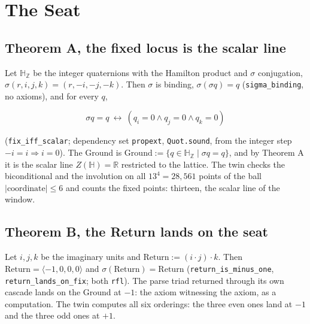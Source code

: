 \documentclass[10pt]{article}
\begin{document}
\hypertarget{the-seat}{%
\section{The Seat}\label{the-seat}}

\hypertarget{theorem-a-the-fixed-locus-is-the-scalar-line}{%
\subsection{Theorem A, the fixed locus is the scalar
line}\label{theorem-a-the-fixed-locus-is-the-scalar-line}}

Let \(\mathbb{H}_{\mathbb{Z}}\) be the integer quaternions with the
Hamilton product and \(\sigma\) conjugation,
\(\sigma(r, i, j, k) = (r, -i, -j, -k)\). Then \(\sigma\) is binding,
\(\sigma(\sigma q) = q\) (\texttt{sigma\_\allowbreak binding}, no
axioms), and for every \(q\),

\[\sigma q = q \ \leftrightarrow\ (q_i = 0 \wedge q_j = 0 \wedge q_k = 0)\]

(\texttt{fix\_\allowbreak iff\_\allowbreak scalar}; dependency set
\texttt{propext}, \texttt{Quot.sound}, from the integer step
\(-i = i \Rightarrow i = 0\)). The Ground is
\(\mathrm{Ground} := \{ q \in \mathbb{H}_{\mathbb{Z}} \mid \sigma q = q \}\),
and by Theorem A it is the scalar line \(Z(\mathbb{H}) = \mathbb{R}\)
restricted to the lattice. The twin checks the biconditional and the
involution on all \(13^4 = 28{,}561\) points of the ball
\(|\text{coordinate}| \le 6\) and counts the fixed points: thirteen, the
scalar line of the window.

\hypertarget{theorem-b-the-return-lands-on-the-seat}{%
\subsection{Theorem B, the Return lands on the
seat}\label{theorem-b-the-return-lands-on-the-seat}}

Let \(i, j, k\) be the imaginary units and
\(\mathrm{Return} := (i \cdot j) \cdot k\). Then
\(\mathrm{Return} = \langle -1, 0, 0, 0 \rangle\) and
\(\sigma(\mathrm{Return}) = \mathrm{Return}\)
(\texttt{return\_\allowbreak is\_\allowbreak minus\_\allowbreak one},
\texttt{return\_\allowbreak lands\_\allowbreak on\_\allowbreak fix};
both \texttt{rfl}). The parse triad returned through its own cascade
lands on the Ground at \(-1\): the axiom witnessing the axiom, as a
computation. The twin computes all six orderings: the three even ones
land at \(-1\) and the three odd ones at \(+1\).
\end{document}
